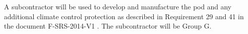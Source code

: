 A subcontractor will be used to develop and manufacture the pod and any additional climate control protection as described in Requirement 29 and 41 in the document F-SRS-2014-V1 . The subcontractor will be Group G. 
